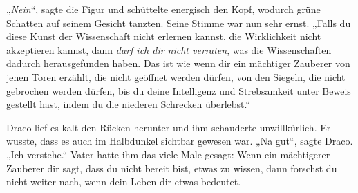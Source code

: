 „\emph{Nein}“, sagte die Figur und schüttelte energisch den Kopf, wodurch grüne Schatten auf seinem Gesicht tanzten. Seine Stimme war nun sehr ernst. „Falls du diese Kunst der Wissenschaft nicht erlernen kannst, die Wirklichkeit nicht akzeptieren kannst, dann \emph{darf ich dir nicht verraten}, was die Wissenschaften dadurch herausgefunden haben. Das ist wie wenn dir ein mächtiger Zauberer von jenen Toren erzählt, die nicht geöffnet werden dürfen, von den Siegeln, die nicht gebrochen werden dürfen, bis du deine Intelligenz und Strebsamkeit unter Beweis gestellt hast, indem du die niederen Schrecken überlebst.“

Draco lief es kalt den Rücken herunter und ihm schauderte unwillkürlich. Er wusste, dass es auch im Halbdunkel sichtbar gewesen war. „Na gut“, sagte Draco. „Ich verstehe.“ Vater hatte ihm das viele Male gesagt: Wenn ein mächtigerer Zauberer dir sagt, dass du nicht bereit bist, etwas zu wissen, dann forschst du nicht weiter nach, wenn dein Leben dir etwas bedeutet.

